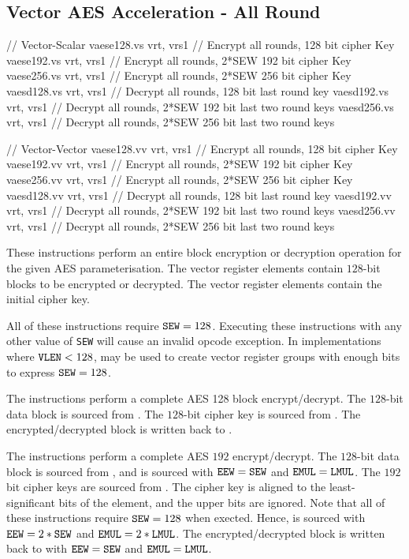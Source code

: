 \subsection{Vector AES Acceleration - All Round}
\label{sec:vector:aes:all-round}

\begin{cryptoisa}
// Vector-Scalar
vaese128.vs vrt, vrs1 // Encrypt all rounds,       128 bit cipher Key
vaese192.vs vrt, vrs1 // Encrypt all rounds, 2*SEW 192 bit cipher Key
vaese256.vs vrt, vrs1 // Encrypt all rounds, 2*SEW 256 bit cipher Key
vaesd128.vs vrt, vrs1 // Decrypt all rounds,       128 bit last     round key
vaesd192.vs vrt, vrs1 // Decrypt all rounds, 2*SEW 192 bit last two round keys
vaesd256.vs vrt, vrs1 // Decrypt all rounds, 2*SEW 256 bit last two round keys

// Vector-Vector
vaese128.vv vrt, vrs1 // Encrypt all rounds,       128 bit cipher Key
vaese192.vv vrt, vrs1 // Encrypt all rounds, 2*SEW 192 bit cipher Key
vaese256.vv vrt, vrs1 // Encrypt all rounds, 2*SEW 256 bit cipher Key
vaesd128.vv vrt, vrs1 // Decrypt all rounds,       128 bit last     round key
vaesd192.vv vrt, vrs1 // Decrypt all rounds, 2*SEW 192 bit last two round keys
vaesd256.vv vrt, vrs1 // Decrypt all rounds, 2*SEW 256 bit last two round keys
\end{cryptoisa}

These instructions perform an entire block encryption or decryption
operation for the given AES parameterisation.
The \vrt vector register elements contain $128$-bit blocks
to be encrypted or decrypted.
The  vector register elements contain the initial
cipher key.

All of these instructions require ${\tt SEW}=128$.
Executing these instructions with any other value of {\tt SEW} will cause
an invalid opcode exception.
In implementations where ${\tt VLEN}<128$, \LMUL may be used to create
vector register groups with enough bits to express ${\tt SEW}=128$.

The  instructions perform a complete AES
128 block encrypt/decrypt.
The $128$-bit data block is sourced from \vrt.
The $128$-bit cipher key is sourced from .
The encrypted/decrypted block is written back to \vrt.

The  instructions perform a complete
AES $192$ encrypt/decrypt.
The $128$-bit data block is sourced from \vrt, and is sourced with
${\tt EEW}={\tt SEW}$ and ${\tt EMUL}={\tt LMUL}$.
The $192$ bit cipher keys are sourced from .
The cipher key is aligned to the least-significant
bits of the element, and the upper bits are ignored.
Note that all of these instructions require ${\tt SEW}=128$ when exected.
Hence,  is sourced with ${\tt EEW}=2*{\tt SEW}$ and ${\tt EMUL}=2*{\tt LMUL}$.
The encrypted/decrypted block is written back to \vrt with
${\tt EEW}={\tt SEW}$ and ${\tt EMUL}={\tt LMUL}$.


